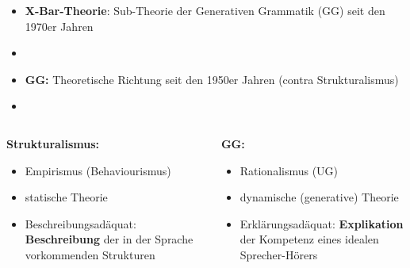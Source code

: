 \begin{frame}

\begin{itemize}

	\item \textbf{X-Bar-Theorie}: Sub-Theorie der Generativen Grammatik (GG) seit den 1970er Jahren \citep{Chomsky70a, Jackendoff77a}
	\item[]	
	\item \textbf{GG:} Theoretische Richtung seit den 1950er Jahren \citep{Chomsky57a} (contra Strukturalismus)
	\item[]
\end{itemize}

\begin{columns}
	
\begin{column}{.5\textwidth}

\textbf{Strukturalismus:}
\begin{itemize}
	\item Empirismus (Behaviourismus)
	\item statische Theorie
	\item Beschreibungsadäquat: \textbf{Beschreibung} der in der Sprache vorkommenden Strukturen
\end{itemize}

\end{column}	
\begin{column}{.5\textwidth}

\textbf{GG:}
\begin{itemize}
	\item Rationalismus (UG)
	\item dynamische (generative) Theorie
	\item Erklärungsadäquat: \textbf{Explikation} der Kompetenz eines idealen Sprecher-Hörers
\end{itemize}

\end{column}

\end{columns}

\end{frame}


